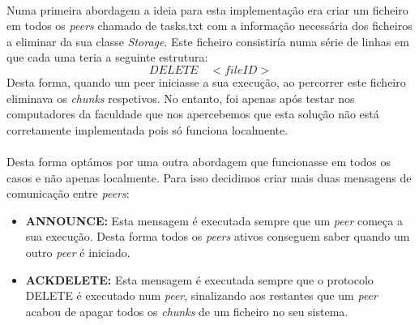 \documentclass[11pt,oneside]{book}
\begin{document}
\paragraph{}
    Numa primeira abordagem a ideia para esta implementação era criar um ficheiro
    em todos os \textit{peers} chamado de tasks.txt com a informação necessária
    dos ficheiros a eliminar da sua classe \textit{Storage}. Este ficheiro consistiría
    numa série de linhas em que cada uma teria a seguinte estrutura:
    \begin{equation}
        DELETE \quad <fileID>
    \end{equation}
    Desta forma, quando um peer iniciasse a sua execução, ao percorrer este ficheiro eliminava os 
    \textit{chunks} respetivos. No entanto, foi apenas após testar nos computadores da 
    faculdade que nos apercebemos que esta solução não está corretamente implementada pois só funciona 
    localmente.


\paragraph{}
    Desta forma optámos por uma outra abordagem que funcionasse em todos os casos
    e não apenas localmente. Para isso decidimos criar mais duas mensagens de comunicação 
    entre \textit{peers}:
    \begin{itemize}
        \item \textbf{ANNOUNCE:} Esta mensagem é executada sempre que um 
        \textit{peer} começa a sua execução. Desta forma todos os \textit{peers} ativos 
        conseguem saber quando um outro \textit{peer} é iniciado.
        \item \textbf{ACKDELETE:} Esta mensagem é executada sempre que o protocolo DELETE
        é executado num \textit{peer}, sinalizando aos restantes que um \textit{peer} acabou 
        de apagar todos os \textit{chunks} de um ficheiro no seu sistema.
    \end{itemize}
\end{document}
